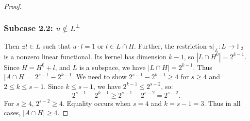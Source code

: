 \documentclass[12pt,twoside,]{amsart}
\theoremstyle{plain}
\theoremstyle{definition}
\begin{document}
\begin{proof}
\subsubsection*{Subcase 2.2: $u \notin L^\perp$}
Then $\exists l \in L$ such that $u \cdot l = 1$ or $l \in L \cap H$. Further, the restriction $u|_L : L \to \mathbb{F}_2$ is a nonzero linear functional.
Its kernel has dimension $k-1$, so $|L \cap H^0| = 2^{k-1}$.
Since $H = H^0 + l$, and $L$ is a subspace,
we have $|L \cap H| = 2^{k-1}$. Thus $|A \cap H| = 2^{s-1} - 2^{k-1}$.
We need to show $2^{s-1} - 2^{k-1} \geq 4$ for $s \geq 4$ and $2 \leq k \leq s-1$. Since $k \leq s-1$, we have $2^{k-1} \leq 2^{s-2}$, so:
\[
2^{s-1} - 2^{k-1} \geq 2^{s-1} - 2^{s-2} = 2^{s-2}.
\]
For $s \geq 4$, $2^{s-2} \geq 4$. Equality occurs when $s = 4$ and $k = s-1 = 3$. Thus in all cases, $|A \cap H| \geq 4$.
\end{proof}
\end{document}

